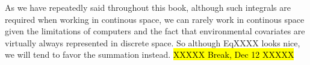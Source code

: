 As we have repeatedly said throughout this book, although such
integrals are required when working in continous space, we can rarely
work in continous space given the limitations of computers and the
fact that environmental covariates are virtually always represented in
discrete space. So although EqXXXX looks nice, we will tend to favor
the summation instead.
\hl{XXXXX Break, Dec 12 XXXXX}

